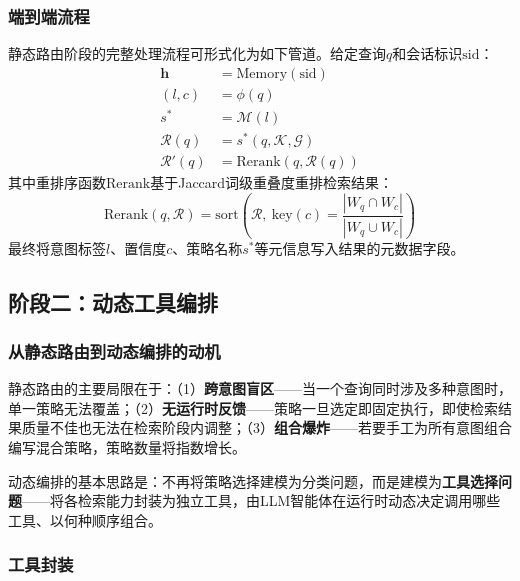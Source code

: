 \documentclass[runningheads]{llncs}
\begin{document}
\subsubsection{端到端流程}

静态路由阶段的完整处理流程可形式化为如下管道。给定查询$q$和会话标识$\text{sid}$：
\begin{equation}
    \begin{aligned}
    \mathbf{h} &= \text{Memory}(\text{sid}) \\
    (l, c) &= \phi(q) \\
    s^* &= \mathcal{M}(l) \\
    \mathcal{R}(q) &= s^*(q, \mathcal{K}, \mathcal{G}) \\
    \mathcal{R}'(q) &= \text{Rerank}(q, \mathcal{R}(q))
    \end{aligned}
\end{equation}
其中重排序函数$\text{Rerank}$基于Jaccard词级重叠度重排检索结果：
\begin{equation}
    \text{Rerank}(q, \mathcal{R}) = \text{sort}\!\left(\mathcal{R},\ \text{key}(c) = \frac{|W_q \cap W_c|}{|W_q \cup W_c|}\right)
\end{equation}
最终将意图标签$l$、置信度$c$、策略名称$s^*$等元信息写入结果的元数据字段。

\subsection{阶段二：动态工具编排}

\subsubsection{从静态路由到动态编排的动机}

静态路由的主要局限在于：（1）\textbf{跨意图盲区}——当一个查询同时涉及多种意图时，单一策略无法覆盖；（2）\textbf{无运行时反馈}——策略一旦选定即固定执行，即使检索结果质量不佳也无法在检索阶段内调整；（3）\textbf{组合爆炸}——若要手工为所有意图组合编写混合策略，策略数量将指数增长。

动态编排的基本思路是：不再将策略选择建模为分类问题，而是建模为\textbf{工具选择问题}——将各检索能力封装为独立工具，由LLM智能体在运行时动态决定调用哪些工具、以何种顺序组合。

\subsubsection{工具封装}
\end{document}
